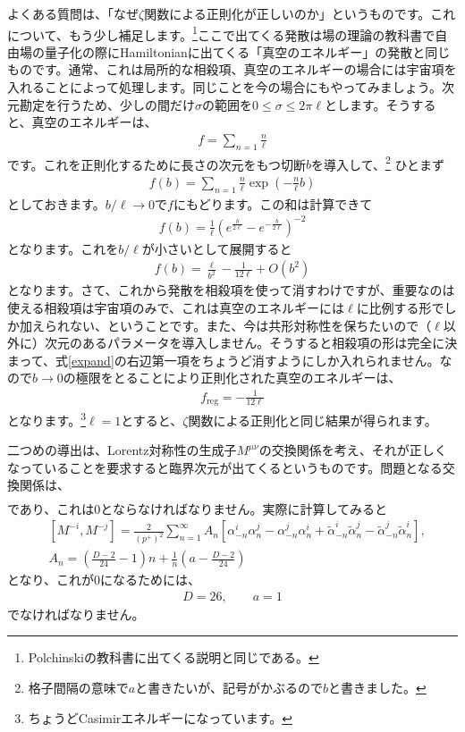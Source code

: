 \documentclass[report,paper=a4, fontsize=12pt, line_length=16cm, number_of_lines=34,dvipdfmx]{jlreq}
\numberwithin{equation}{chapter}
\numberwithin{equation}{section}
\newcommand{\alphat}{\tilde{\alpha}}
\begin{document}
よくある質問は、「なぜ$\zeta$関数による正則化が正しいのか」というものです。これについて、もう少し補足します。\footnote{Polchinskiの教科書に出てくる説明と同じである。}ここで出てくる発散は場の理論の教科書で自由場の量子化の際にHamiltonianに出てくる「真空のエネルギー」の発散と同じものです。通常、これは局所的な相殺項、真空のエネルギーの場合には宇宙項を入れることによって処理します。同じことを今の場合にもやってみましょう。次元勘定を行うため、少しの間だけ$\sigma$の範囲を$0\le \sigma \le 2\pi \ell$とします。そうすると、真空のエネルギーは、
\begin{align}
f=\sum_{n=1}\frac{n}{\ell}
\end{align}
です。これを正則化するために長さの次元をもつ切断$b$を導入して、\footnote{格子間隔の意味で$a$と書きたいが、記号がかぶるので$b$と書きました。}
ひとまず
\begin{align}
f(b)=\sum_{n=1}\frac{n}{\ell} \exp\left(-\frac{n}{\ell} b\right)
\end{align}
としておきます。$b/\ell \to 0$で$f$にもどります。この和は計算できて
\begin{align}
f(b)=\frac{1}{\ell}(e^{\frac{b}{2\ell}}-e^{-\frac{b}{2\ell}})^{-2}
\end{align}
となります。これを$b/\ell$が小さいとして展開すると
\begin{align}
f(b)=\frac{\ell}{b^2}-\frac{1}{12\ell}+O(b^2)\label{expand}
\end{align}
となります。さて、これから発散を相殺項を使って消すわけですが、重要なのは使える相殺項は宇宙項のみで、これは真空のエネルギーには$\ell$に比例する形でしか加えられない、ということです。また、今は共形対称性を保ちたいので（$\ell$以外に）次元のあるパラメータを導入しません。そうすると相殺項の形は完全に決まって、式\eqref{expand}の右辺第一項をちょうど消すようにしか入れられません。なので$b\to 0$の極限をとることにより正則化された真空のエネルギーは、
\begin{align}
f_{\mathrm{reg}}=-\frac{1}{12\ell}
\end{align}
となります。\footnote{ちょうどCasimirエネルギーになっています。}$\ell=1$とすると、$\zeta$関数による正則化と同じ結果が得られます。

二つめの導出は、Lorentz対称性の生成子$M^{\mu\nu}$の交換関係を考え、それが正しくなっていることを要求すると臨界次元が出てくるというものです。問題となる交換関係は、
\begin{align}
[M^{-i},M^{-j}]
\end{align}
であり、これは$0$とならなければなりません。実際に計算してみると
\begin{align}
&[M^{-i},M^{-j}]=\frac{2}{(p^{+})^2}\sum_{n=1}^{\infty}A_{n}
\left[
\alpha_{-n}^i\alpha_{n}^j
-\alpha_{-n}^j\alpha_{n}^i
+\alphat_{-n}^i\alphat_{n}^j
-\alphat_{-n}^j\alphat_{n}^i
\right],\nonumber\\
&A_n=\left(\frac{D-2}{24}-1\right)n+
\frac{1}{n}\left(a-\frac{D-2}{24}\right)
\end{align}
となり、これが$0$になるためには、
\begin{align}
D=26,\qquad a=1
\end{align}
でなければなりません。
\end{document}
